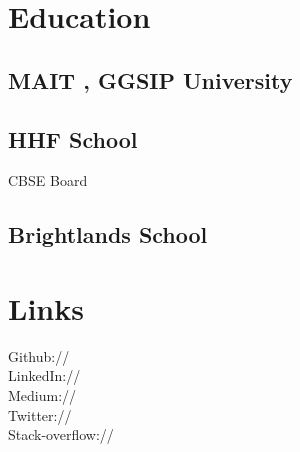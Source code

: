\documentclass[]{deedy-resume-openfont}
\begin{document}
%

%
%


%
%

\begin{minipage}[t]{0.33\textwidth} 


\section{Education} 

\subsection{MAIT , GGSIP University}
\sectionsep


\subsection{HHF School}
CBSE Board \\
\sectionsep

\subsection{Brightlands School}
\sectionsep


\section{Links} 
Github:// \href{https://github.com/rishab-sharma}{} \\
LinkedIn://\href{https://www.linkedin.com/in/rishab-sharma-955506104/}{} \\
Medium://  \href{https://medium.com/@rishusharma.sharma7}{} \\
Twitter://  \href{https://twitter.com/RishuSharma2}{} \\
Stack-overflow://  \href{https://stackoverflow.com/users/8678694/rishab?tab=profile}{}
\sectionsep


\end{minipage}
\end{document}
